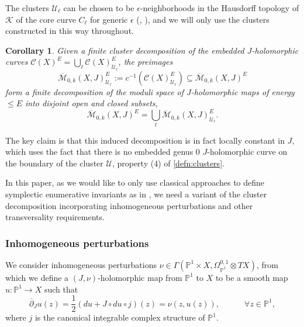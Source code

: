 \documentclass[reqno]{amsart}
\numberwithin{equation}{section}
\numberwithin{equation}{section}
\numberwithin{equation}{section}
\newtheorem{cor}[thm]{Corollary}
\theoremstyle{definition}
\theoremstyle{remark}
\theoremstyle{remark}
\newcommand{\ov}{\overline}
\begin{document}
The clusters $\mathcal{U}_\ell$ can be chosen to be $\epsilon$-neighborhoods in the Hausdorff topology of $\mathcal{K}$ of the core curve $C_\ell$ for generic $\epsilon$ (\cite[Lemma 2.3]{IP-GV}, \cite[Proposition 3.17]{doan2021gopakumar}), and we will only use the clusters constructed in this way throughout.

\begin{cor}
    Given a finite cluster decomposition of the embedded $J$-holomorphic curves $\mathcal{C}(X)^E = \bigcup_{\ell} \mathcal{C}(X)^E_{\mathcal{U}_\ell}$, the preimages
    \begin{equation}
        \ov{\mathcal{M}}_{0,k}(X,J)_{\mathcal{U}_\ell}^E := c^{-1} \left( \mathcal{C}(X)^E_{\mathcal{U}_\ell} \right) \subseteq \ov{\mathcal{M}}_{0,k}(X,J)^E
    \end{equation}
    form a finite decomposition of the moduli space of $J$-holomorphic maps of energy $\le E$ into disjoint open and closed subsets,
    \begin{equation}
        \ov{\mathcal{M}}_{0,k}(X,J)^E = \bigcup_{\ell} \ov{\mathcal{M}}_{0,k}(X,J)_{\mathcal{U}_\ell}^E.
    \end{equation}
\end{cor}

The key claim \cite[Lemma 2.1]{IP-GV} is that this induced decomposition is in fact locally constant in $J$, which uses the fact that there is no embedded genus $0$ $J$-holomorphic curve on the boundary of the cluster $\mathcal{U}$, property (4) of \cref{defn:clusters}.

In this paper, as we would like to only use classical approaches to define symplectic enumerative invariants as in \cite{MS12}, we need a variant of the cluster decomposition incorporating inhomogeneous perturbations and other transversality requirements. 


\subsubsection{Inhomogeneous perturbations}
We consider inhomogeneous perturbations $\nu \in \Gamma(\mathbb{P}^1 \times X, \Omega^{0,1}_{\mathbb{P}^1} \otimes TX)$, from which we define a $(J, \nu)$-holomorphic map from $\mathbb{P}^1$ to $X$ to be a smooth map $u: \mathbb{P}^1 \to X$ such that
\begin{equation}
    \ov{\partial}_{J} u(z) = \frac12 (du + J \circ du \circ j)(z) = \nu(z, u(z)), \quad \quad \quad \forall z \in \mathbb{P}^1,
\end{equation}
where $j$ is the canonical integrable complex structure of $\mathbb{P}^1$.
\end{document}
